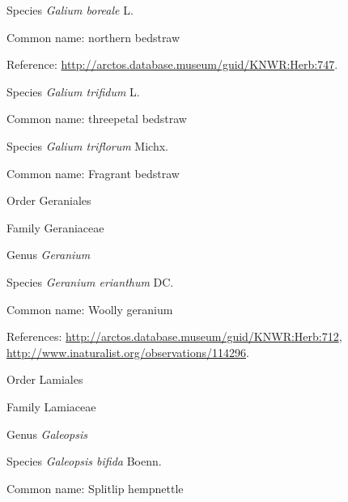 \documentclass[9pt, article]{memoir}
\begin{document}
\begin{multicols}{2}
\vspace{6pt}\noindent\hspace{36pt}Species \textit{Galium boreale} L.


Common name: northern bedstraw

Reference: 
\url{http://arctos.database.museum/guid/KNWR:Herb:747}.

\vspace{6pt}\noindent\hspace{36pt}Species \textit{Galium trifidum} L.


Common name: threepetal bedstraw

\vspace{6pt}\noindent\hspace{36pt}Species \textit{Galium triflorum} Michx.


Common name: Fragrant bedstraw

\vspace{6pt}\noindent\hspace{18pt}Order Geraniales


\vspace{6pt}\noindent\hspace{24pt}Family Geraniaceae


\vspace{6pt}\noindent\hspace{30pt}Genus \textit{Geranium}


\vspace{6pt}\noindent\hspace{36pt}Species \textit{Geranium erianthum} DC.


Common name: Woolly geranium

References: 
\url{http://arctos.database.museum/guid/KNWR:Herb:712}, 
\url{http://www.inaturalist.org/observations/114296}.

\vspace{6pt}\noindent\hspace{18pt}Order Lamiales


\vspace{6pt}\noindent\hspace{24pt}Family Lamiaceae


\vspace{6pt}\noindent\hspace{30pt}Genus \textit{Galeopsis}


\vspace{6pt}\noindent\hspace{36pt}Species \textit{Galeopsis bifida} Boenn.


Common name: Splitlip hempnettle


\end{multicols}
\end{document}
